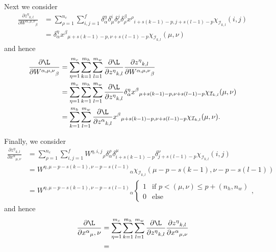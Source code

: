 Next we consider
\begin{align*}
	\frac{\partial z{^\eta}{_{k,l}}}{\partial W^{\alpha,\mu,\nu}{_\beta}}&=\sum_{\rho=1}^{n_c}\sum_{i,j=1}^f\delta^\eta_\alpha\delta^i_\mu\delta^j_\nu\delta^\beta_\rho x^\rho{_{i+s(k-1)-p,j+s(l-1)-p}}\chi_{\mathcal{I}_{k,l}}(i,j)\\
	&=\delta^\eta_\alpha x^\beta{_{\mu+s(k-1)-p,\nu+s(l-1)-p}}\chi_{\mathcal{I}_{k,l}}(\mu,\nu)
\end{align*}
and hence
\begin{align*}
	\frac{\partial\L}{\partial W^{\alpha,\mu,\nu}{_\beta}}&=\sum_{\eta=1}^{m_c}\sum_{k=1}^{m_h}\sum_{l=1}^{m_w}\frac{\partial\L}{\partial z^\eta{_{k,l}}}\frac{\partial z{^\eta}{_{k,l}}}{\partial W^{\alpha,\mu,\nu}{_\beta}}\\
	&=\sum_{\eta=1}^{m_c}\sum_{k=1}^{m_h}\sum_{l=1}^{m_w}\frac{\partial\L}{\partial z^\eta{_{k,l}}}\delta^\eta_\alpha x^\beta{_{\mu+s(k-1)-p,\nu+s(l-1)-p}}\chi_{\mathcal{I}_{k,l}}(\mu,\nu)\\
	&=\sum_{k=1}^{m_h}\sum_{l=1}^{m_w}\frac{\partial\L}{\partial z^\alpha{_{k,l}}}x^\beta{_{\mu+s(k-1)-p,\nu+s(l-1)-p}}\chi_{\mathcal{I}_{k,l}}(\mu,\nu).
\end{align*}

Finally, we consider
\begin{align*}
	\frac{\partial z^\eta{_{k,l}}}{\partial x^\alpha{_{\mu,\nu}}}&=\sum_{\rho=1}^{n_c}\sum_{i,j=1}^fW^{\eta,i,j}{_\rho}\delta_\alpha^\rho\delta^\mu_{i+s(k-1)-p}\delta^\nu_{j+s(l-1)-p}\chi_{\mathcal{I}_{k,l}}(i,j)\\
	&=W^{\eta,\mu-p-s(k-1),\nu-p-s(l-1)}{_\alpha}\chi_{\mathcal{I}_{k,l}}(\mu-p-s(k-1),\nu-p-s(l-1))\\
	&=W^{\eta,\mu-p-s(k-1),\nu-p-s(l-1)}{_\alpha}\begin{cases}
		1&\text{if }p<(\mu,\nu)\leq p+(n_h,n_w)\\
		0&\text{else}
	\end{cases},
\end{align*}
and hence
\begin{align*}
	\frac{\partial\L}{\partial x^\alpha{_\mu,\nu}}&=\sum_{\eta=1}^{m_c}\sum_{k=1}^{m_h}\sum_{l=1}^{m_w}\frac{\partial\L}{\partial z^\eta{_{k,l}}}\frac{\partial z^\eta{_{k,l}}}{\partial x^\alpha{_{\mu,\nu}}}\\
	&=
\end{align*}







